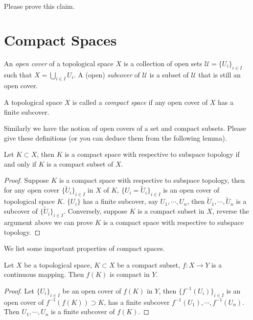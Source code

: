 Please prove this claim.

\section{Compact Spaces}

\begin{defn}
    An \emph{open cover} of a topological space $X$ is a collection of open sets $\mathcal{U}=\{U_i\}_{i\in I}$ such that $X=\bigcup_{i\in I}U_i$.
    A (open) \emph{subcover} of $\mathcal{U}$ is a subset of $\mathcal{U}$ that is still an open cover.
\end{defn}

\begin{defn}
    A topological space $X$ is called a \emph{compact space} if any open cover of $X$ has a finite subcover.
\end{defn}

Similarly we have the notion of open covers of a set and compact subsets.
Please give these definitions (or you can deduce them from the following lemma).

\begin{lem}
    Let $K\subset X$, then $K$ is a compact space with respective to subspace topology if and only if $K$ is a compact subset of $X$.
\end{lem}
\begin{proof}
    Suppose $K$ is a compact space with respective to subspace topology, then for any open cover $\{\tilde{U}_i\}_{i\in I}$ in $X$ of $K$, $\{U_i=\tilde{U}_i\}_{i\in I}$ is an open cover of topological space $K$.
    $\{U_i\}$ has a finite subcover, say $U_1,\cdots,U_n$, then $\tilde{U}_1,\cdots,\tilde{U}_n$ is a subcover of $\{\tilde{U}_i\}_{i\in I}$.
    Conversely, suppose $K$ is a compact subset in $X$, reverse the argument above we can prove $K$ is a compact space with respective to subspace topology.
\end{proof}

We list some important properties of compact spaces.

\begin{prop}
    Let $X$ be a topological space, $K\subset X$ be a compact subset, $f:X\to Y$ is a continuous mapping.
    Then $f(K)$ is compact in $Y$.
\end{prop}
\begin{proof}
    Let $\{U_i\}_{i\in I}$ be an open cover of $f(K)$ in $Y$, then $\{f^{-1}(U_i)\}_{i\in I}$ is an open cover of $f^{-1}(f(K))\supset K$, has a finite subcover $f^{-1}(U_1),\cdots,f^{-1}(U_n)$.
    Then $U_1,\cdots,U_n$ is a finite subcover of $f(K)$.
\end{proof}

